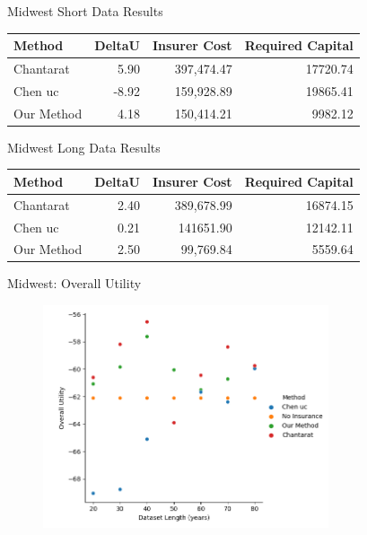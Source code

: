\documentclass{beamer}
\begin{document}
\begin{frame}{Midwest Short Data Results}
    \begin{table}
        \centering
        \begin{tabular}{lrrr}
            \toprule
            Method & DeltaU & Insurer Cost & Required Capital \\
            \midrule
            Chantarat & 5.90 & 397,474.47 & 17720.74 \\
            Chen uc & -8.92 & 159,928.89 & 19865.41 \\
            Our Method & 4.18 & 150,414.21 & 9982.12 \\
            \bottomrule
            \end{tabular}
    \end{table}
    
        
\end{frame}

\begin{frame}{Midwest Long Data Results}
    \begin{table}
        \centering
        \begin{tabular}{lrrr}
            \toprule
            Method & DeltaU & Insurer Cost & Required Capital \\
            \midrule
            Chantarat & 2.40 & 389,678.99 & 16874.15 \\
            Chen uc & 0.21 & 141651.90 & 12142.11 \\
            Our Method & 2.50 & 99,769.84 & 5559.64 \\
            \bottomrule
            \end{tabular}
    \end{table}
    
\end{frame}

\begin{frame}{Midwest: Overall Utility}
    \begin{figure}
        \includegraphics[width=0.75\textwidth]{../../../output/figures/Midwest Evaluation/Midwest_Overall Utility_Length.png}
    \end{figure}
\end{frame}
\end{document}
